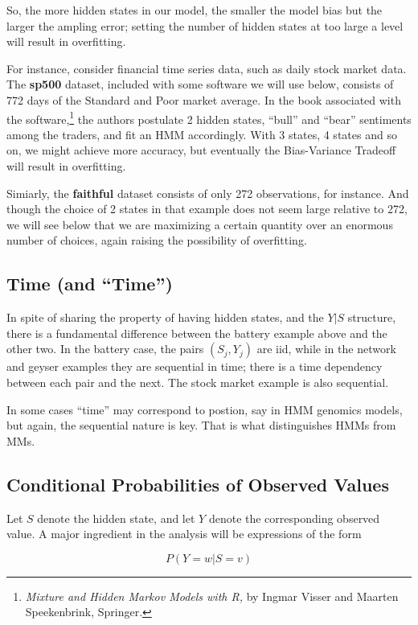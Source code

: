 \documentclass[11pt]{article}
\begin{document}
So, the more hidden states in our model, the smaller the model bias but
the larger the ampling error; setting the number of hidden states at too
large a level will result in overfitting.

For instance, consider financial time series data, such as daily stock
market data.  The \textbf{sp500} dataset, included with some software we
will use below, consists of 772 days of the Standard and Poor market
average.  In the book associated with the software,\footnote{\textit{Mixture and
Hidden Markov Models with R,} by Ingmar Visser and Maarten
Speekenbrink, Springer.} the authors postulate 2 hidden states, ``bull''
and ``bear'' sentiments among the traders, and fit an HMM accordingly.
With 3 states, 4 states and so on, we might achieve more accuracy, 
but eventually the Bias-Variance Tradeoff will result in overfitting.

Simiarly, the \textbf{faithful} dataset consists of only 272
observations, for instance.  And though the choice of 2 states in that
example does not seem large relative to 272, we will see below that we
are maximizing a certain quantity over an enormous number of choices,
again raising the possibility of overfitting.

\subsection{Time (and ``Time'')}

In spite of sharing the property of having hidden states, and the $Y|S$
structure, there is a fundamental difference between the battery example
above and the other two.  In the battery case, the pairs $(S_j,Y_j)$ are
iid, while in the network and geyser examples they are sequential in
time; there is a time dependency between each pair and the next.  The
stock market example is also sequential.

In some cases ``time'' may correspond to postion, say in HMM genomics
models, but again, the sequential nature is key.  That is what
distinguishes HMMs from MMs.

\subsection{Conditional Probabilities of Observed Values}

Let $S$ denote the hidden state, and let $Y$ denote the corresponding
observed value.  A major ingredient in the analysis will be expressions of
the form

\begin{equation}
P(Y = w | S  = v)
\end{equation}
\end{document}
